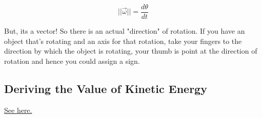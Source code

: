 \documentclass[letterpaper]{article}
\begin{document}
\begin{equation}
||\vec{\omega}|| = \frac{d\theta}{dt}
\end{equation}

But, its a vector! So there is an actual "direction" of rotation. If you have an object that's rotating and an axis for that rotation, take your fingers to the direction by which the object is rotating, your thumb is point at the direction of rotation and hence you could assign a sign.

\subsection{Deriving the Value of Kinetic Energy}
\label{sec:orged942ec}
\href{KBhPHYS360RotationalKineticEnergyDerivation.org}{See here.}
\end{document}
